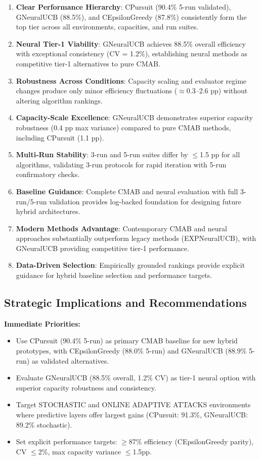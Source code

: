 \documentclass[12pt,a4paper]{article}
\newcommand{\success}[1]{\textcolor{successcolor}{\textbf{#1}}}
\newcommand{\legacy}[1]{\textcolor{legacycolor}{\textbf{#1}}}
\newcommand{\neural}[1]{\textcolor{neuralcolor}{\textbf{#1}}}
\begin{document}
\begin{enumerate}
\item \textbf{Clear Performance Hierarchy}: CPursuit (90.4\% 5-run validated), GNeuralUCB (88.5\%), and CEpsilonGreedy (87.8\%) consistently form the top tier across all environments, capacities, and run suites.
\item \neural{Neural Tier-1 Viability}: GNeuralUCB achieves 88.5\% overall efficiency with exceptional consistency (CV = 1.2\%), establishing neural methods as competitive tier-1 alternatives to pure CMAB.
\item \textbf{Robustness Across Conditions}: Capacity scaling and evaluator regime changes produce only minor efficiency fluctuations ($\approx$0.3--2.6 pp) without altering algorithm rankings.
\item \neural{Capacity-Scale Excellence}: GNeuralUCB demonstrates superior capacity robustness (0.4 pp max variance) compared to pure CMAB methods, including CPursuit (1.1 pp).
\item \success{Multi-Run Stability}: 3-run and 5-run suites differ by $\leq$1.5 pp for all algorithms, validating 3-run protocols for rapid iteration with 5-run confirmatory checks.
\item \textbf{Baseline Guidance}: Complete CMAB and neural evaluation with full 3-run/5-run validation provides log-backed foundation for designing future hybrid architectures.
\item \legacy{Modern Methods Advantage}: Contemporary CMAB and neural approaches substantially outperform legacy methods (EXPNeuralUCB), with GNeuralUCB providing competitive tier-1 performance.
\item \textbf{Data-Driven Selection}: Empirically grounded rankings provide explicit guidance for hybrid baseline selection and performance targets.
\end{enumerate}

\subsection{Strategic Implications and Recommendations}

\textbf{Immediate Priorities:}
\begin{itemize}
\item Use CPursuit (90.4\% 5-run) as primary CMAB baseline for new hybrid prototypes, with CEpsilonGreedy (88.0\% 5-run) and GNeuralUCB (88.9\% 5-run) as validated alternatives.
\item Evaluate GNeuralUCB (88.5\% overall, 1.2\% CV) as tier-1 neural option with superior capacity robustness and consistency.
\item Target STOCHASTIC and ONLINE ADAPTIVE ATTACKS environments where predictive layers offer largest gains (CPursuit: 91.3\%, GNeuralUCB: 89.2\% stochastic).
\item Set explicit performance targets: $\geq$87\% efficiency (CEpsilonGreedy parity), CV $\leq$2\%, max capacity variance $\leq$1.5pp.
\end{itemize}
\end{document}
